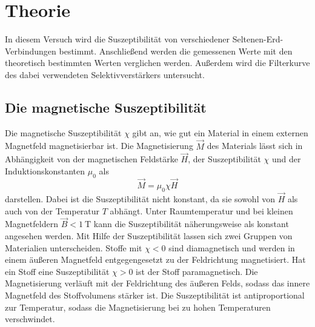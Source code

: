 \section{Theorie}
\label{sec:Theorie}
In diesem Versuch wird die Suszeptibilität von verschiedener Seltenen-Erd-Verbindungen bestimmt. 
Anschließend werden die gemessenen Werte mit den theoretisch bestimmten Werten verglichen werden.
Außerdem wird die Filterkurve des dabei verwendeten Selektivverstärkers untersucht. 
\\
\subsection{Die magnetische Suszeptibilität}
Die magnetische Suszeptibilität $\chi$ gibt an, wie gut ein Material in einem externen Magnetfeld magnetisierbar ist.
Die Magnetisierung $\vec{M}$ des Materials lässt sich in Abhängigkeit von der magnetischen Feldstärke $\vec{H}$, der Suszeptibilität $\chi$ und der 
Induktionskonstanten $\mu_0$ als
\begin{equation}
    \vec{M}=\mu_0 \chi \vec{H}
\end{equation}
darstellen. Dabei ist die Suszeptibilität nicht konstant, da sie sowohl von $\vec{H}$ als auch von der Temperatur $T$ abhängt. Unter Raumtemperatur und bei kleinen Magnetfeldern $\vec{B}<\SI{1}{\tesla}$
kann die Suszeptibilität näherungsweise als konstant angesehen werden. Mit Hilfe der Suszeptibilität lassen sich zwei Gruppen von Materialien unterscheiden.
Stoffe mit $\chi<0$ sind diamagnetisch und werden in einem äußeren Magnetfeld entgegengesetzt zu der Feldrichtung magnetisiert. Hat ein Stoff eine Suszeptibilität $\chi>0$ ist der Stoff
paramagnetisch. Die Magnetisierung verläuft mit der Feldrichtung des äußeren Felds, sodass das innere Magnetfeld des Stoffvolumens stärker ist. Die Suszeptibilität
ist antiproportional zur Temperatur, sodass die Magnetisierung bei zu hohen Temperaturen verschwindet.
\\
